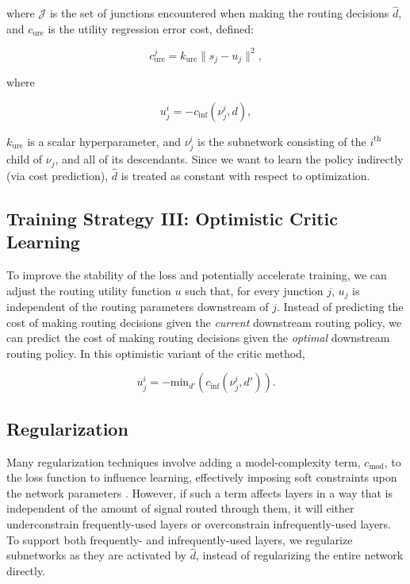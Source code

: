 \documentclass{article}
\begin{document}
  where $\mathcal{J}$ is the set of junctions encountered when making the routing decisions $\hat{d}$, and $c_\text{ure}$ is the utility regression error cost, defined:
  
  \begin{equation}
    c_\text{ure}^j = k_\text{ure} \|s_j - u_j\|^2,
  \end{equation}
  
  where
  
  \begin{equation}
    u_j^i = -c_\text{inf}(\nu_j^i,d),
  \end{equation}
  
  $k_\text{ure}$ is a scalar hyperparameter, and $\nu_j^i$ is the subnetwork consisting of the $i^\text{th}$ child of $\nu_j$, and all of its descendants. Since we want to learn the policy indirectly (via cost prediction), $\hat{d}$ is treated as constant with respect to optimization.

  \subsection{Training Strategy III: Optimistic Critic Learning}
  
  To improve the stability of the loss and potentially accelerate training, we can adjust the routing utility function $u$ such that, for every junction $j$, $u_j$ is independent of the routing parameters downstream of $j$. Instead of predicting the cost of making routing decisions given the \textit{current} downstream routing policy, we can predict the cost of making routing decisions given the \textit{optimal} downstream routing policy. In this optimistic variant of the critic method,

  \begin{equation}
    u_j^i = -\text{min}_{d'}(c_\text{inf}(\nu_j^i,d')).
  \end{equation}

  \subsection{Regularization}
  \label{subsec:regularization}

  Many regularization techniques involve adding a model-complexity term, $c_\text{mod}$, to the loss function to influence learning, effectively imposing soft constraints upon the network parameters \cite{hoerl1970ridge,rudin1992nonlinear,tibshirani1996regression}. However, if such a term affects layers in a way that is independent of the amount of signal routed through them, it will either underconstrain frequently-used layers or overconstrain infrequently-used layers. To support both frequently- and infrequently-used layers, we regularize subnetworks as they are activated by $\hat{d}$, instead of regularizing the entire network directly.
  
\end{document}
